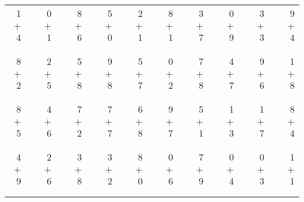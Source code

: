 \documentclass[12pt, letterpaper]{article}
\begin{document}
\begin{tabular}{rrrrrrrrrrrrrrrrrrr}
1 & & 0 & & 8 & & 5 & & 2 & & 8 & & 3 & & 0 & & 3 & & 9\\
$+$ 4 & & $+$ 1 & & $+$ 6 & & $+$ 0 & & $+$ 1 & & $+$ 1 & & $+$ 7 & & $+$ 9 & & $+$ 3 & & $+$ 4\\
\cline{1-1} \cline{3-3} \cline{5-5} \cline{7-7} \cline{9-9} \cline{11-11} \cline{13-13} \cline{15-15} \cline{17-17} \cline{19-19} \\ \\
8 & & 2 & & 5 & & 9 & & 5 & & 0 & & 7 & & 4 & & 9 & & 1\\
$+$ 2 & & $+$ 5 & & $+$ 8 & & $+$ 8 & & $+$ 7 & & $+$ 2 & & $+$ 8 & & $+$ 7 & & $+$ 6 & & $+$ 8\\
\cline{1-1} \cline{3-3} \cline{5-5} \cline{7-7} \cline{9-9} \cline{11-11} \cline{13-13} \cline{15-15} \cline{17-17} \cline{19-19} \\ \\
8 & & 4 & & 7 & & 7 & & 6 & & 9 & & 5 & & 1 & & 1 & & 8\\
$+$ 5 & & $+$ 6 & & $+$ 2 & & $+$ 7 & & $+$ 8 & & $+$ 7 & & $+$ 1 & & $+$ 3 & & $+$ 7 & & $+$ 4\\
\cline{1-1} \cline{3-3} \cline{5-5} \cline{7-7} \cline{9-9} \cline{11-11} \cline{13-13} \cline{15-15} \cline{17-17} \cline{19-19} \\ \\
4 & & 2 & & 3 & & 3 & & 8 & & 0 & & 7 & & 0 & & 0 & & 1\\
$+$ 9 & & $+$ 6 & & $+$ 8 & & $+$ 2 & & $+$ 0 & & $+$ 6 & & $+$ 9 & & $+$ 4 & & $+$ 3 & & $+$ 1\\
\cline{1-1} \cline{3-3} \cline{5-5} \cline{7-7} \cline{9-9} \cline{11-11} \cline{13-13} \cline{15-15} \cline{17-17} \cline{19-19} \\ \\
\end{tabular}
\newpage
\end{document}
